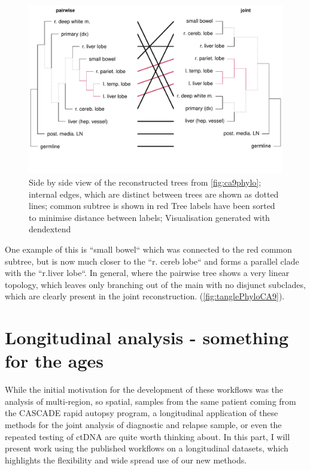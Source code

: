 \begin{figure}[!ht]
\centering
\includegraphics[width=.99\linewidth]{Figures/tanglePhyloCA9.pdf}
\caption[Tanglegram of the reconstructed phylogenies]{Side by side view of the reconstructed trees from \autoref{fig:ca9phylo}; internal edges, which are distinct between trees are shown as dotted lines; common subtree is shown in red  Tree labels have been sorted to minimise distance between labels; Visualisation generated with dendextend \cite{Galili2015}}\label{fig:tanglePhyloCA9}
\end{figure}

One example of this is ``small bowel`` which was connected to the red common subtree, but is now much closer to the ``r. cereb lobe`` and forms a parallel clade with the ``r.liver lobe``. In general, where the pairwise tree shows a very linear topology, which leaves only branching out of the main with no disjunct subclades, which are clearly present in the joint reconstruction.  (\autoref{fig:tanglePhyloCA9}).


\section[Longitudinal analysis]{Longitudinal analysis - something for the ages }
\label{variantcalling-sec:longitudinal}

While the initial motivation for the development of these workflows was the analysis of multi-region, so spatial, samples from the same patient coming from the CASCADE rapid autopsy program, a longitudinal application of these methods for the joint analysis of diagnostic and relapse sample, or even the repeated testing of ctDNA are quite worth thinking about. In this part, I will present work using the published workflows on a longitudinal datasets, which highlights the flexibility and wide spread use of our new methods.

